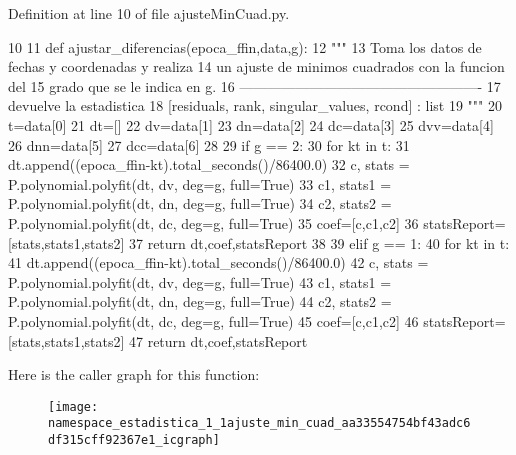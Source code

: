 \-Definition at line 10 of file ajuste\-Min\-Cuad.\-py.


\begin{DoxyCode}
10 
11 def ajustar_diferencias(epoca_ffin,data,g):
12     """
13     Toma los datos de fechas y coordenadas y realiza
14     un ajuste de minimos cuadrados con la funcion del 
15     grado que se le indica en g.
16     ----------------------------------------------------
17     devuelve la estadistica
18     [residuals, rank, singular_values, rcond] : list
19     """
20     t=data[0]
21     dt=[]
22     dv=data[1]
23     dn=data[2]
24     dc=data[3]
25     dvv=data[4]
26     dnn=data[5]
27     dcc=data[6]
28     
29     if g == 2:    
30         for kt in t:
31             dt.append((epoca_ffin-kt).total_seconds()/86400.0)
32         c, stats = P.polynomial.polyfit(dt, dv, deg=g, full=True)
33         c1, stats1 = P.polynomial.polyfit(dt, dn, deg=g, full=True)
34         c2, stats2 = P.polynomial.polyfit(dt, dc, deg=g, full=True)
35         coef=[c,c1,c2]
36         statsReport=[stats,stats1,stats2] 
37         return dt,coef,statsReport
38     
39     elif g == 1:
40         for kt in t:
41             dt.append((epoca_ffin-kt).total_seconds()/86400.0)
42         c, stats = P.polynomial.polyfit(dt, dv, deg=g, full=True)
43         c1, stats1 = P.polynomial.polyfit(dt, dn, deg=g, full=True)
44         c2, stats2 = P.polynomial.polyfit(dt, dc, deg=g, full=True)
45         coef=[c,c1,c2]
46         statsReport=[stats,stats1,stats2] 
47         return dt,coef,statsReport
        \end{DoxyCode}


\-Here is the caller graph for this function\-:\nopagebreak
\begin{figure}[H]
\begin{center}
\leavevmode
\texttt{[image: namespace\_estadistica\_1\_1ajuste\_min\_cuad\_aa33554754bf43adc6df315cff92367e1\_icgraph]}
\end{center}
\end{figure}


